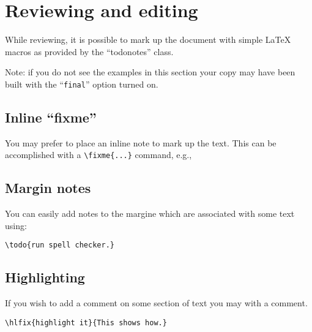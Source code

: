 \chapter{Reviewing and editing}
\label{ch:review}


While reviewing, it is possible to mark up the document with simple
\LaTeX{} macros as provided by the ``todonotes'' class.

Note: if you do not see the examples in this section your copy may
have been built with the ``\texttt{final}'' option turned on.

\section{Inline ``fixme''}

You may prefer to place an inline note to mark up the text.
This can be accomplished with a  \verb|\fixme{...}| command, e.g.,


\section{Margin notes}

You can easily add notes to the  margine  which
are associated with some text using:

\begin{verbatim}
\todo{run spell checker.}
\end{verbatim}


\section{Highlighting}

If you wish to add a comment on some section of text you may
 with a comment.


\begin{verbatim}
\hlfix{highlight it}{This shows how.}
\end{verbatim}


